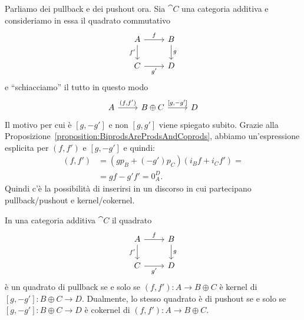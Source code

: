 Parliamo dei pullback e dei pushout ora. Sia \(\cat C\) una categoria
additiva e consideriamo in essa il quadrato commutativo
\[
  \begin{tikzcd}
    A \ar["{f}", r] \ar["{f'}", d, swap] & B \ar["{g}", d] \\
    C \ar["{g'}", r, swap] & D
  \end{tikzcd}
\]
e ``schiacciamo'' il tutto in questo modo
\[
  \begin{tikzcd}
    A \ar["{(f, f')}", r] & B \oplus C \ar["{[g, -g']}", r] & D
  \end{tikzcd}
\]
Il motivo per cui è \([g, -g']\) e non \([g, g']\) viene spiegato
subito. Grazie alla
Proposizione~\ref{proposition:BiprodsAreProdsAndCoprods}, abbiamo
un'espressione esplicita per \((f,f')\) e \([g,-g']\) e quindi:
\begin{align*} [g, -g'] (f, f') &= (g p_B + (-g') p_C) (i_B f + i_C f') = \\
                                &= g f - g' f' = 0_A^D .
\end{align*}
Quindi c'è la possibilità di inserirsi in un discorso in cui partecipano
pullback/pushout e kernel/cokernel.

\begin{proposition}\label{proposition:FromPullbackToKernel}
  In una categoria additiva \(\cat C\) il quadrato
  \[
    \begin{tikzcd}
      A \ar["{f}", r] \ar["{f'}", d, swap] & B \ar["{g}", d] \\
      C \ar["{g'}", r, swap] & D
    \end{tikzcd}
  \]
  è un quadrato di pullback se e solo se \((f, f') : A \to B \oplus C\)
  è kernel di \([g, -g'] : B \oplus C \to D\). Dualmente, lo stesso
  quadrato è di pushout se e solo se \([g, -g'] : B \oplus C \to D\) è
  cokernel di \((f, f') : A \to B \oplus C\).
\end{proposition}

